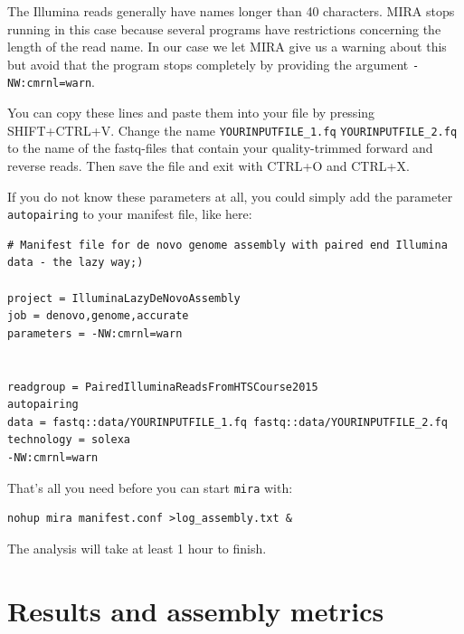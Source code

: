 \documentclass[11pt]{article}
\begin{document}
The Illumina reads generally have names longer than 40
characters. MIRA stops running in this case because several programs
have restrictions concerning the length of the read name. In our case
we let MIRA give us a warning about this but avoid that the program
stops completely by providing the argument \texttt{-NW:cmrnl=warn}.


You can copy these lines and paste them into your file by pressing
SHIFT+CTRL+V. Change the name \texttt{YOURINPUTFILE\_1.fq}
\texttt{YOURINPUTFILE\_2.fq} to the name of the fastq-files that contain your
quality-trimmed forward and reverse reads. Then save the file and exit
with CTRL+O and CTRL+X.

If you do not know these parameters at all, you could simply add the
parameter \texttt{autopairing} to your manifest file, like here:

\begin{verbatim}
# Manifest file for de novo genome assembly with paired end Illumina data - the lazy way;)

project = IlluminaLazyDeNovoAssembly
job = denovo,genome,accurate
parameters = -NW:cmrnl=warn


readgroup = PairedIlluminaReadsFromHTSCourse2015
autopairing
data = fastq::data/YOURINPUTFILE_1.fq fastq::data/YOURINPUTFILE_2.fq
technology = solexa
-NW:cmrnl=warn
\end{verbatim}


That's all you need before you can start \texttt{mira} with:


\begin{verbatim}
nohup mira manifest.conf >log_assembly.txt &
\end{verbatim}


The analysis will take at least 1 hour to finish.

\section{Results and assembly metrics}
\label{sec-2}
\end{document}

